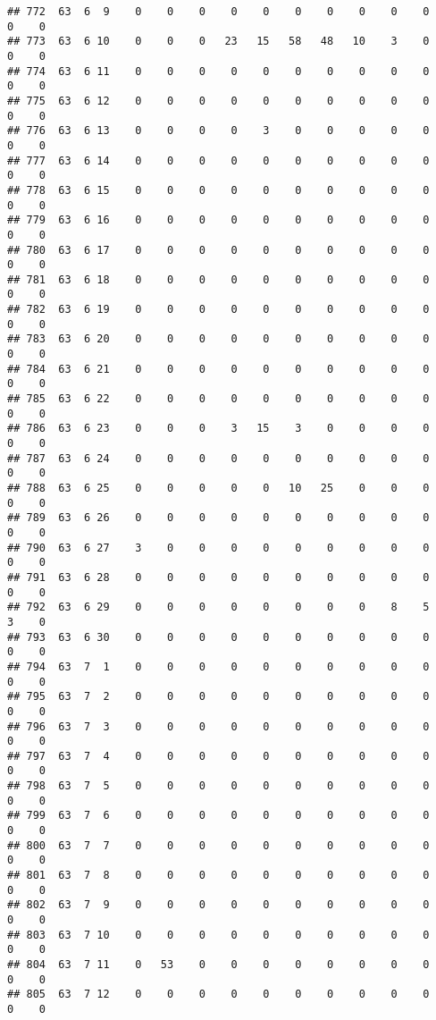 \documentclass[]{article}
\begin{document}
\begin{verbatim}
## 772  63  6  9    0    0    0    0    0    0    0    0    0    0    0    0
## 773  63  6 10    0    0    0   23   15   58   48   10    3    0    0    0
## 774  63  6 11    0    0    0    0    0    0    0    0    0    0    0    0
## 775  63  6 12    0    0    0    0    0    0    0    0    0    0    0    0
## 776  63  6 13    0    0    0    0    3    0    0    0    0    0    0    0
## 777  63  6 14    0    0    0    0    0    0    0    0    0    0    0    0
## 778  63  6 15    0    0    0    0    0    0    0    0    0    0    0    0
## 779  63  6 16    0    0    0    0    0    0    0    0    0    0    0    0
## 780  63  6 17    0    0    0    0    0    0    0    0    0    0    0    0
## 781  63  6 18    0    0    0    0    0    0    0    0    0    0    0    0
## 782  63  6 19    0    0    0    0    0    0    0    0    0    0    0    0
## 783  63  6 20    0    0    0    0    0    0    0    0    0    0    0    0
## 784  63  6 21    0    0    0    0    0    0    0    0    0    0    0    0
## 785  63  6 22    0    0    0    0    0    0    0    0    0    0    0    0
## 786  63  6 23    0    0    0    3   15    3    0    0    0    0    0    0
## 787  63  6 24    0    0    0    0    0    0    0    0    0    0    0    0
## 788  63  6 25    0    0    0    0    0   10   25    0    0    0    0    0
## 789  63  6 26    0    0    0    0    0    0    0    0    0    0    0    0
## 790  63  6 27    3    0    0    0    0    0    0    0    0    0    0    0
## 791  63  6 28    0    0    0    0    0    0    0    0    0    0    0    0
## 792  63  6 29    0    0    0    0    0    0    0    0    8    5    3    0
## 793  63  6 30    0    0    0    0    0    0    0    0    0    0    0    0
## 794  63  7  1    0    0    0    0    0    0    0    0    0    0    0    0
## 795  63  7  2    0    0    0    0    0    0    0    0    0    0    0    0
## 796  63  7  3    0    0    0    0    0    0    0    0    0    0    0    0
## 797  63  7  4    0    0    0    0    0    0    0    0    0    0    0    0
## 798  63  7  5    0    0    0    0    0    0    0    0    0    0    0    0
## 799  63  7  6    0    0    0    0    0    0    0    0    0    0    0    0
## 800  63  7  7    0    0    0    0    0    0    0    0    0    0    0    0
## 801  63  7  8    0    0    0    0    0    0    0    0    0    0    0    0
## 802  63  7  9    0    0    0    0    0    0    0    0    0    0    0    0
## 803  63  7 10    0    0    0    0    0    0    0    0    0    0    0    0
## 804  63  7 11    0   53    0    0    0    0    0    0    0    0    0    0
## 805  63  7 12    0    0    0    0    0    0    0    0    0    0    0    0

\end{verbatim}
\end{document}
